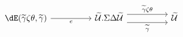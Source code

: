 \[\begin{tikzcd}
	{\dE(\widetilde{\gamma}\zeta\theta,\widetilde{\gamma})} && {\Tm.\Sigma\Delta\Tm} && \Tm
	\arrow["{\widetilde{\gamma}\zeta\theta}", shift left=2, from=1-3, to=1-5]
	\arrow["{\widetilde{\gamma}}"', shift right=2, from=1-3, to=1-5]
	\arrow["e"', from=1-1, to=1-3]
\end{tikzcd}\]